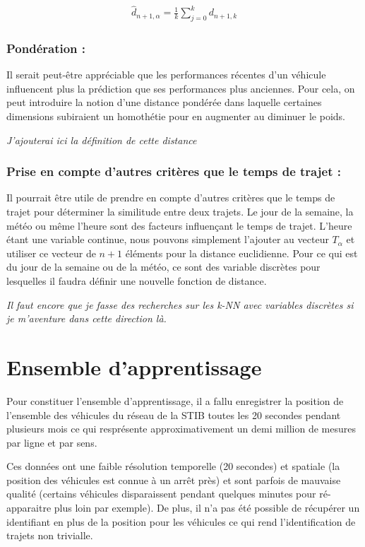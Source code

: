 \documentclass[letterpaper]{article}
\begin{document}
\begin{eqnarray}
\hat{d}_{n+1,\alpha} = \frac{1}{k} \sum_{j=0}^{k}d_{n+1,k}
\end{eqnarray}

\subsubsection{Pondération :}
Il serait peut-être appréciable que les performances récentes d'un véhicule influencent plus la prédiction que ses performances plus anciennes. Pour cela, on peut introduire la notion d'une distance pondérée dans laquelle certaines dimensions subiraient un homothétie pour en augmenter au diminuer le poids.

\textit{J'ajouterai ici la définition de cette distance}

\subsubsection{Prise en compte d'autres critères que le temps de trajet :}
Il pourrait être utile de prendre en compte d'autres critères que le temps de trajet pour déterminer la similitude entre deux trajets.
Le jour de la semaine, la météo ou même l'heure sont des facteurs influençant le temps de trajet.
L'heure étant une variable continue, nous pouvons simplement l'ajouter au vecteur $T_{\alpha}$ et utiliser ce vecteur de $n+1$ éléments pour la distance euclidienne. Pour ce qui est du jour de la semaine ou de la météo, ce sont des variable discrètes pour lesquelles il faudra définir une nouvelle fonction de distance.

\textit{Il faut encore que je fasse des recherches sur les k-NN avec variables discrètes si je m'aventure dans cette direction là.}


\section{Ensemble d'apprentissage}

Pour constituer l'ensemble d'apprentissage, il a fallu enregistrer la position de l'ensemble des véhicules du réseau de la STIB toutes les 20 secondes pendant plusieurs mois ce qui resprésente approximativement un demi million de  mesures par ligne et par sens.

Ces données ont une faible résolution temporelle (20 secondes) et spatiale (la position des véhicules est connue à un arrêt près) et sont parfois de mauvaise qualité (certains véhicules disparaissent pendant quelques minutes pour ré-apparaitre plus loin par exemple). De plus, il n'a pas été possible de récupérer un identifiant en plus de la position pour les véhicules ce qui rend l'identification de trajets non trivialle.
\end{document}
